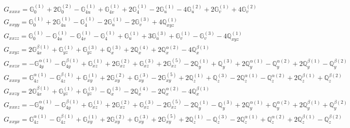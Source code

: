 \documentclass[fleqn,8pt,landscape]{jsarticle}
\begin{document}
\begin{align*}
& G_{xxxx} = \mathbb{G}_{0}^{(1)} + 2 \mathbb{G}_{0}^{(2)} - \mathbb{G}_{4u}^{(1)} + \mathbb{G}_{4v}^{(1)} + 2 \mathbb{G}_{4}^{(1)} - 2 \mathbb{G}_{u}^{(1)} - 4 \mathbb{G}_{u}^{(2)} + 2 \mathbb{G}_{v}^{(1)} + 4 \mathbb{G}_{v}^{(2)} \\
& G_{xxyy} = \mathbb{G}_{0}^{(1)} + 2 \mathbb{G}_{4u}^{(1)} - \mathbb{G}_{4}^{(1)} - 2 \mathbb{G}_{u}^{(1)} - 2 \mathbb{G}_{v}^{(3)} + 4 \mathbb{Q}_{xyz}^{(1)} \\
& G_{xxzz} = \mathbb{G}_{0}^{(1)} - \mathbb{G}_{4u}^{(1)} - \mathbb{G}_{4v}^{(1)} - \mathbb{G}_{4}^{(1)} + \mathbb{G}_{u}^{(1)} + 3 \mathbb{G}_{u}^{(3)} + \mathbb{G}_{v}^{(1)} - \mathbb{G}_{v}^{(3)} - 4 \mathbb{Q}_{xyz}^{(1)} \\
& G_{xxyz} = 2 \mathbb{G}_{4x}^{\beta(1)} + \mathbb{G}_{yz}^{(1)} + \mathbb{G}_{yz}^{(3)} + \mathbb{Q}_{x}^{(3)} + 2 \mathbb{Q}_{x}^{(4)} + 2 \mathbb{Q}_{x}^{\alpha(2)} - 4 \mathbb{Q}_{x}^{\beta(1)} \\
& G_{xxzx} = - \mathbb{G}_{4y}^{\alpha(1)} - \mathbb{G}_{4y}^{\beta(1)} + \mathbb{G}_{xz}^{(1)} + 2 \mathbb{G}_{xz}^{(2)} + \mathbb{G}_{xz}^{(3)} + 2 \mathbb{G}_{xz}^{(5)} - 2 \mathbb{Q}_{y}^{(1)} + \mathbb{Q}_{y}^{(3)} + 2 \mathbb{Q}_{y}^{\alpha(1)} - \mathbb{Q}_{y}^{\alpha(2)} + 2 \mathbb{Q}_{y}^{\beta(1)} - \mathbb{Q}_{y}^{\beta(2)} \\
& G_{xxxy} = \mathbb{G}_{4z}^{\alpha(1)} - \mathbb{G}_{4z}^{\beta(1)} + \mathbb{G}_{xy}^{(1)} + 2 \mathbb{G}_{xy}^{(2)} + \mathbb{G}_{xy}^{(3)} - 2 \mathbb{G}_{xy}^{(5)} + 2 \mathbb{Q}_{z}^{(1)} + \mathbb{Q}_{z}^{(3)} - 2 \mathbb{Q}_{z}^{\alpha(1)} - \mathbb{Q}_{z}^{\alpha(2)} + 2 \mathbb{Q}_{z}^{\beta(1)} + \mathbb{Q}_{z}^{\beta(2)} \\
& G_{xxzy} = 2 \mathbb{G}_{4x}^{\beta(1)} + \mathbb{G}_{yz}^{(1)} + \mathbb{G}_{yz}^{(3)} - \mathbb{Q}_{x}^{(3)} - 2 \mathbb{Q}_{x}^{(4)} - 2 \mathbb{Q}_{x}^{\alpha(2)} - 4 \mathbb{Q}_{x}^{\beta(1)} \\
& G_{xxxz} = - \mathbb{G}_{4y}^{\alpha(1)} - \mathbb{G}_{4y}^{\beta(1)} + \mathbb{G}_{xz}^{(1)} + 2 \mathbb{G}_{xz}^{(2)} + \mathbb{G}_{xz}^{(3)} - 2 \mathbb{G}_{xz}^{(5)} - 2 \mathbb{Q}_{y}^{(1)} - \mathbb{Q}_{y}^{(3)} + 2 \mathbb{Q}_{y}^{\alpha(1)} + \mathbb{Q}_{y}^{\alpha(2)} + 2 \mathbb{Q}_{y}^{\beta(1)} + \mathbb{Q}_{y}^{\beta(2)} \\
& G_{xxyx} = \mathbb{G}_{4z}^{\alpha(1)} - \mathbb{G}_{4z}^{\beta(1)} + \mathbb{G}_{xy}^{(1)} + 2 \mathbb{G}_{xy}^{(2)} + \mathbb{G}_{xy}^{(3)} + 2 \mathbb{G}_{xy}^{(5)} + 2 \mathbb{Q}_{z}^{(1)} - \mathbb{Q}_{z}^{(3)} - 2 \mathbb{Q}_{z}^{\alpha(1)} + \mathbb{Q}_{z}^{\alpha(2)} + 2 \mathbb{Q}_{z}^{\beta(1)} - \mathbb{Q}_{z}^{\beta(2)} \\

\end{align*}
\end{document}
